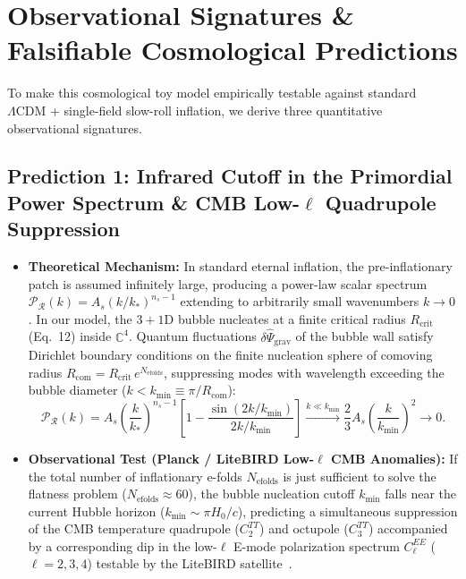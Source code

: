 \documentclass[11pt,a4paper]{article}
\begin{document}
\section{Observational Signatures \& Falsifiable Cosmological Predictions}

To make this cosmological toy model empirically testable against standard $\Lambda\text{CDM}$ + single-field slow-roll inflation, we derive three quantitative observational signatures.

\subsection{Prediction 1: Infrared Cutoff in the Primordial Power Spectrum \& CMB Low-\texorpdfstring{$\ell$}{l} Quadrupole Suppression}
\begin{itemize}
    \item \textbf{Theoretical Mechanism:} In standard eternal inflation, the pre-inflationary patch is assumed infinitely large, producing a power-law scalar spectrum $\mathcal{P}_{\mathcal{R}}(k) = A_s (k/k_*)^{n_s - 1}$ extending to arbitrarily small wavenumbers $k \to 0$. In our model, the $3+1\text{D}$ bubble nucleates at a finite critical radius $R_{\text{crit}}$ (Eq.\ 12) inside $\mathbb{C}^4$. Quantum fluctuations $\delta\hat{\Psi}_{\text{grav}}$ of the bubble wall satisfy Dirichlet boundary conditions on the finite nucleation sphere of comoving radius $R_{\text{com}} = R_{\text{crit}}\, e^{N_{\text{efolds}}}$, suppressing modes with wavelength exceeding the bubble diameter ($k < k_{\text{min}} \equiv \pi / R_{\text{com}}$):
    \begin{equation}
    \mathcal{P}_{\mathcal{R}}(k) = A_s \left(\frac{k}{k_*}\right)^{n_s - 1} \left[ 1 - \frac{\sin(2 k / k_{\text{min}})}{2 k / k_{\text{min}}} \right] \xrightarrow{k \ll k_{\text{min}}} \frac{2}{3} A_s \left(\frac{k}{k_{\text{min}}}\right)^2 \to 0.
    \end{equation}
    \item \textbf{Observational Test (Planck / LiteBIRD Low-$\ell$ CMB Anomalies):} If the total number of inflationary e-folds $N_{\text{efolds}}$ is just sufficient to solve the flatness problem ($N_{\text{efolds}} \approx 60$), the bubble nucleation cutoff $k_{\text{min}}$ falls near the current Hubble horizon ($k_{\text{min}} \sim \pi H_0 / c$), predicting a simultaneous suppression of the CMB temperature quadrupole ($C_2^{TT}$) and octupole ($C_3^{TT}$) accompanied by a corresponding dip in the low-$\ell$ E-mode polarization spectrum $C_\ell^{EE}$ ($\ell = 2, 3, 4$) testable by the LiteBIRD satellite~\cite{Planck2018}.
\end{itemize}
\end{document}

